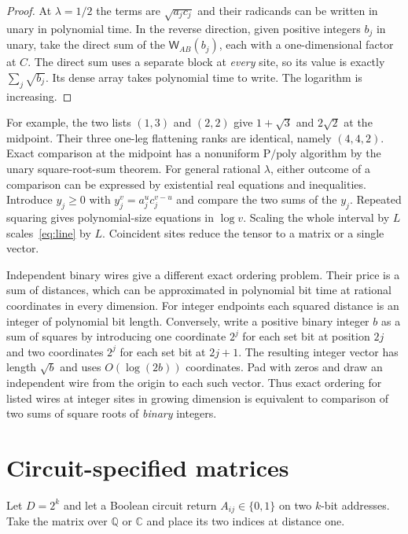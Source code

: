 \documentclass[11pt,letterpaper]{article}
\theoremstyle{definition}
\newcommand{\Q}{\mathbb Q}
\newcommand{\C}{\mathbb C}
\newcommand{\wire}{\mathsf W}
\begin{document}
\begin{proof}
At \(\lambda=1/2\) the terms are \(\sqrt{a_jc_j}\) and their radicands
can be written in unary in polynomial time. In the reverse direction,
given positive integers \(b_j\) in unary, take the direct sum of the
\(\wire_{AB}(b_j)\), each with a one-dimensional factor at \(C\).
The direct sum uses a separate block at \emph{every} site, so its value
is exactly \(\sum_j\sqrt{b_j}\). Its dense array takes polynomial time to
write. The logarithm is increasing.
\end{proof}

For example, the two lists \((1,3)\) and \((2,2)\) give \(1+\sqrt3\)
and \(2\sqrt2\) at the midpoint. Their three one-leg flattening ranks
are identical, namely \((4,4,2)\). Exact comparison at the midpoint has
a nonuniform \(\mathrm P/\mathrm{poly}\) algorithm by the unary
square-root-sum theorem. For general rational \(\lambda\), either outcome
of a comparison can be expressed by existential real equations and
inequalities. Introduce \(y_j\ge0\) with
\(y_j^v=a_j^u c_j^{v-u}\) and compare the two sums of the \(y_j\).
Repeated squaring gives polynomial-size equations in \(\log v\).
Scaling the whole interval by \(L\) scales~\eqref{eq:line} by \(L\).
Coincident sites reduce the tensor to a matrix or a single vector.
\cite{balaji-datta-ussr}

Independent binary wires give a different exact ordering problem. Their
price is a sum of distances, which can be approximated in polynomial bit
time at rational coordinates in every dimension. For integer endpoints
each squared distance is an integer of polynomial bit length. Conversely,
write a positive binary integer \(b\) as a sum of squares by introducing
one coordinate \(2^j\) for each set bit at position \(2j\) and two
coordinates \(2^j\) for each set bit at \(2j+1\). The resulting integer
vector has length \(\sqrt b\) and uses \(O(\log(2b))\) coordinates.
Pad with zeros and draw an independent wire from the origin to each such
vector. Thus exact ordering for listed wires at integer sites in growing
dimension is equivalent to comparison of two sums of square roots of
\emph{binary} integers.

\section{Circuit-specified matrices}
\label{sec:succinct}

Let \(D=2^k\) and let a Boolean circuit return \(A_{ij}\in\{0,1\}\) on
two \(k\)-bit addresses. Take the matrix over \(\Q\) or \(\C\) and
place its two indices at distance one.
\end{document}
